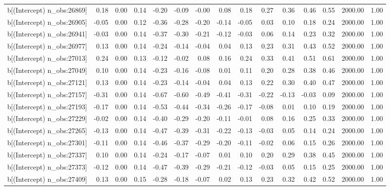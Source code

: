 \begin{table}[ht]
\begin{tabular}{rrrrrrrrrrrrrrr}
  b[(Intercept) n\_obs:26869] & 0.18 & 0.00 & 0.14 & -0.20 & -0.09 & -0.00 & 0.08 & 0.18 & 0.27 & 0.36 & 0.46 & 0.55 & 2000.00 & 1.00 \\ 
  b[(Intercept) n\_obs:26905] & -0.05 & 0.00 & 0.12 & -0.36 & -0.28 & -0.20 & -0.14 & -0.05 & 0.03 & 0.10 & 0.18 & 0.24 & 2000.00 & 1.00 \\ 
  b[(Intercept) n\_obs:26941] & -0.03 & 0.00 & 0.14 & -0.37 & -0.30 & -0.21 & -0.12 & -0.03 & 0.06 & 0.14 & 0.23 & 0.32 & 2000.00 & 1.00 \\ 
  b[(Intercept) n\_obs:26977] & 0.13 & 0.00 & 0.14 & -0.24 & -0.14 & -0.04 & 0.04 & 0.13 & 0.23 & 0.31 & 0.43 & 0.52 & 2000.00 & 1.00 \\ 
  b[(Intercept) n\_obs:27013] & 0.24 & 0.00 & 0.13 & -0.12 & -0.02 & 0.08 & 0.16 & 0.24 & 0.33 & 0.41 & 0.51 & 0.61 & 2000.00 & 1.00 \\ 
  b[(Intercept) n\_obs:27049] & 0.10 & 0.00 & 0.14 & -0.23 & -0.16 & -0.08 & 0.01 & 0.11 & 0.20 & 0.28 & 0.38 & 0.46 & 2000.00 & 1.00 \\ 
  b[(Intercept) n\_obs:27121] & 0.13 & 0.00 & 0.14 & -0.23 & -0.14 & -0.04 & 0.04 & 0.13 & 0.22 & 0.30 & 0.40 & 0.47 & 2000.00 & 1.00 \\ 
  b[(Intercept) n\_obs:27157] & -0.31 & 0.00 & 0.14 & -0.67 & -0.60 & -0.49 & -0.41 & -0.31 & -0.22 & -0.13 & -0.03 & 0.09 & 2000.00 & 1.00 \\ 
  b[(Intercept) n\_obs:27193] & -0.17 & 0.00 & 0.14 & -0.53 & -0.44 & -0.34 & -0.26 & -0.17 & -0.08 & 0.01 & 0.10 & 0.19 & 2000.00 & 1.00 \\ 
  b[(Intercept) n\_obs:27229] & -0.02 & 0.00 & 0.14 & -0.40 & -0.29 & -0.20 & -0.11 & -0.01 & 0.08 & 0.16 & 0.25 & 0.33 & 2000.00 & 1.00 \\ 
  b[(Intercept) n\_obs:27265] & -0.13 & 0.00 & 0.14 & -0.47 & -0.39 & -0.31 & -0.22 & -0.13 & -0.03 & 0.05 & 0.14 & 0.24 & 2000.00 & 1.00 \\ 
  b[(Intercept) n\_obs:27301] & -0.11 & 0.00 & 0.14 & -0.46 & -0.37 & -0.29 & -0.20 & -0.11 & -0.02 & 0.06 & 0.15 & 0.26 & 2000.00 & 1.00 \\ 
  b[(Intercept) n\_obs:27337] & 0.10 & 0.00 & 0.14 & -0.24 & -0.17 & -0.07 & 0.01 & 0.10 & 0.20 & 0.29 & 0.38 & 0.45 & 2000.00 & 1.00 \\ 
  b[(Intercept) n\_obs:27373] & -0.12 & 0.00 & 0.14 & -0.47 & -0.39 & -0.29 & -0.21 & -0.12 & -0.03 & 0.05 & 0.15 & 0.25 & 2000.00 & 1.00 \\ 
  b[(Intercept) n\_obs:27409] & 0.13 & 0.00 & 0.15 & -0.28 & -0.18 & -0.07 & 0.02 & 0.13 & 0.23 & 0.32 & 0.42 & 0.52 & 2000.00 & 1.00 \\ 

\end{tabular}
\end{table}

